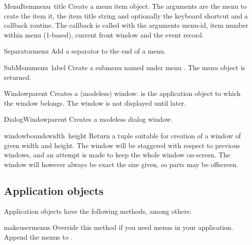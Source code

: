 \begin{funcdesc}{MenuItem}{menu\, title}
Create a menu item object. The arguments are the menu to crate the
item it, the item title string and optionally the keyboard shortcut
and a callback routine. The callback is called with the arguments
menu-id, item number within menu (1-based), current front window and
the event record.
\end{funcdesc}

\begin{funcdesc}{Separator}{menu}
Add a separator to the end of a menu.
\end{funcdesc}

\begin{funcdesc}{SubMenu}{menu\, label}
Create a submenu named  under menu . The menu
object is returned.
\end{funcdesc}

\begin{funcdesc}{Window}{parent}
Creates a (modeless) window.  is the application object to
which the window belongs. The window is not displayed until later.
\end{funcdesc}

\begin{funcdesc}{DialogWindow}{parent}
Creates a modeless dialog window.
\end{funcdesc}

\begin{funcdesc}{windowbounds}{width\, height}
Return a  tuple suitable for creation
of a window of given width and height. The window will be staggered
with respect to previous windows, and an attempt is made to keep the
whole window on-screen. The window will however always be exact the
size given, so parts may be offscreen.
\end{funcdesc}


\subsection{Application objects}
Application objects have the following methods, among others:

\renewcommand{\indexsubitem}{(Application method)}

\begin{funcdesc}{makeusermenus}{}
Override this method if you need menus in your application. Append the
menus to .
\end{funcdesc}

